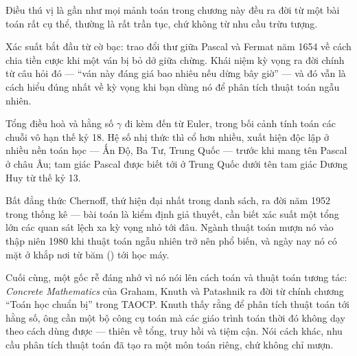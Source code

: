 \documentclass[../../algorithm.tex]{subfiles}
\begin{document}
Điều thú vị là gần như mọi mảnh toán trong chương này đều ra đời từ một bài toán rất cụ thể, thường là rất trần tục, chứ không từ nhu cầu trừu tượng.

Xác suất bắt đầu từ cờ bạc: trao đổi thư giữa Pascal và Fermat năm 1654 về cách chia tiền cược khi một ván bị bỏ dở giữa chừng. Khái niệm kỳ vọng ra đời chính từ câu hỏi đó --- ``ván này đáng giá bao nhiêu nếu dừng bây giờ'' --- và đó vẫn là cách hiểu đúng nhất về kỳ vọng khi bạn dùng nó để phân tích thuật toán ngẫu nhiên.

Tổng điều hoà và hằng số \(\gamma\) đi kèm đến từ Euler, trong bối cảnh tính toán các chuỗi vô hạn thế kỷ 18. Hệ số nhị thức thì cổ hơn nhiều, xuất hiện độc lập ở nhiều nền toán học --- Ấn Độ, Ba Tư, Trung Quốc --- trước khi mang tên Pascal ở châu Âu; tam giác Pascal được biết tới ở Trung Quốc dưới tên tam giác Dương Huy từ thế kỷ 13.

Bất đẳng thức Chernoff, thứ hiện đại nhất trong danh sách, ra đời năm 1952 trong thống kê --- bài toán là kiểm định giả thuyết, cần biết xác suất một tổng lớn các quan sát lệch xa kỳ vọng nhỏ tới đâu. Ngành thuật toán mượn nó vào thập niên 1980 khi thuật toán ngẫu nhiên trở nên phổ biến, và ngày nay nó có mặt ở khắp nơi từ băm () tới học máy.

Cuối cùng, một gốc rễ đáng nhớ vì nó nói lên cách toán và thuật toán tương tác: \emph{Concrete Mathematics}\cite{graham1994} của Graham, Knuth và Patashnik ra đời từ chính chương ``Toán học chuẩn bị'' trong TAOCP. Knuth thấy rằng để phân tích thuật toán tới hằng số, ông cần một bộ công cụ toán mà các giáo trình toán thời đó không dạy theo cách dùng được --- thiên về tổng, truy hồi và tiệm cận. Nói cách khác, nhu cầu phân tích thuật toán đã tạo ra một môn toán riêng, chứ không chỉ mượn.

\begin{gocre}
\end{gocre}
\end{document}
